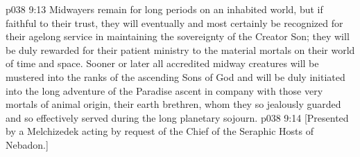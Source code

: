 \vs p038 9:13 \pc Midwayers remain for long periods on an inhabited world, but if faithful to their trust, they will eventually and most certainly be recognized for their agelong service in maintaining the sovereignty of the Creator Son; they will be duly rewarded for their patient ministry to the material mortals on their world of time and space. Sooner or later all accredited midway creatures will be mustered into the ranks of the ascending Sons of God and will be duly initiated into the long adventure of the Paradise ascent in company with those very mortals of animal origin, their earth brethren, whom they so jealously guarded and so effectively served during the long planetary sojourn.
\vsetoff
\vs p038 9:14 [Presented by a Melchizedek acting by request of the Chief of the Seraphic Hosts of Nebadon.]
\quizlink
